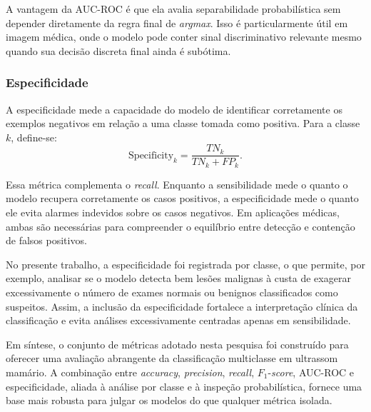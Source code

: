 \documentclass[tcc,capa]{texufpel}
\begin{document}
A vantagem da AUC-ROC é que ela avalia separabilidade probabilística sem depender diretamente da regra final de \textit{argmax}. Isso é particularmente útil em imagem médica, onde o modelo pode conter sinal discriminativo relevante mesmo quando sua decisão discreta final ainda é subótima.

\subsubsection{Especificidade}

A especificidade mede a capacidade do modelo de identificar corretamente os exemplos negativos em relação a uma classe tomada como positiva. Para a classe \(k\), define-se:
\[
\text{Specificity}_k
=
\frac{TN_k}{TN_k + FP_k}.
\]

Essa métrica complementa o \textit{recall}. Enquanto a sensibilidade mede o quanto o modelo recupera corretamente os casos positivos, a especificidade mede o quanto ele evita alarmes indevidos sobre os casos negativos. Em aplicações médicas, ambas são necessárias para compreender o equilíbrio entre detecção e contenção de falsos positivos.

No presente trabalho, a especificidade foi registrada por classe, o que permite, por exemplo, analisar se o modelo detecta bem lesões malignas à custa de exagerar excessivamente o número de exames normais ou benignos classificados como suspeitos. Assim, a inclusão da especificidade fortalece a interpretação clínica da classificação e evita análises excessivamente centradas apenas em sensibilidade.

Em síntese, o conjunto de métricas adotado nesta pesquisa foi construído para oferecer uma avaliação abrangente da classificação multiclasse em ultrassom mamário. A combinação entre \textit{accuracy}, \textit{precision}, \textit{recall}, \(F_1\)-\textit{score}, AUC-ROC e especificidade, aliada à análise por classe e à inspeção probabilística, fornece uma base mais robusta para julgar os modelos do que qualquer métrica isolada.
\end{document}
